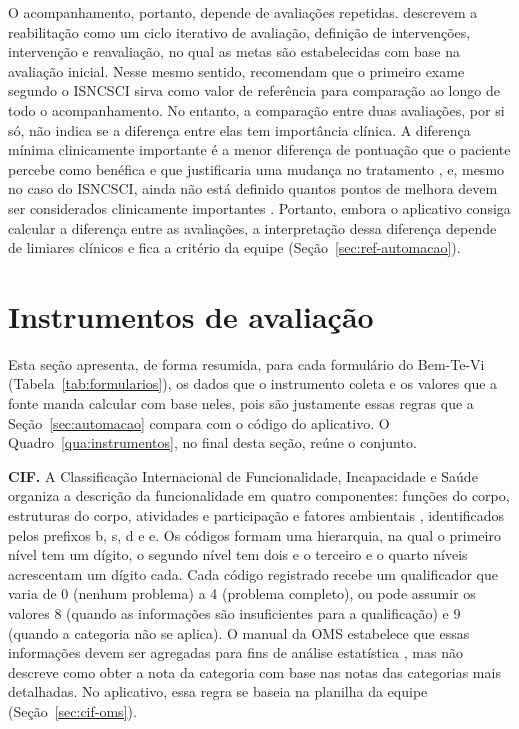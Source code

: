 O acompanhamento, portanto, depende de avaliações repetidas.  descrevem a
reabilitação como um ciclo iterativo de avaliação, definição de intervenções, intervenção e reavaliação, no qual as
metas são estabelecidas com base na avaliação inicial. Nesse mesmo sentido, 
recomendam que o primeiro exame segundo o ISNCSCI sirva como valor de referência para comparação ao longo de todo o
acompanhamento. No entanto, a comparação entre duas avaliações, por si só, não indica se a diferença entre elas tem
importância clínica. A diferença mínima clinicamente importante é a menor diferença de pontuação que o paciente
percebe como benéfica e que justificaria uma mudança no tratamento \cite[p.~408]{jaeschke1989mcid}, e, mesmo no
caso do ISNCSCI, ainda não está definido quantos pontos de melhora devem ser considerados clinicamente importantes
\cite[p.~9]{ahuja2017traumatic}. Portanto, embora o aplicativo consiga calcular a diferença entre as avaliações, a
interpretação dessa diferença depende de limiares clínicos e fica a critério da equipe (Seção~\ref{sec:ref-automacao}).

\section{Instrumentos de avaliação}
\label{sec:ref-instrumentos}

Esta seção apresenta, de forma resumida, para cada formulário do Bem-Te-Vi (Tabela~\ref{tab:formularios}), os dados
que o instrumento coleta e os valores que a fonte manda calcular com base neles, pois são justamente essas regras que
a Seção~\ref{sec:automacao} compara com o código do aplicativo. O Quadro~\ref{qua:instrumentos}, no final desta
seção, reúne o conjunto.

\textbf{CIF.} A Classificação Internacional de Funcionalidade, Incapacidade e Saúde organiza a descrição da
funcionalidade em quatro componentes: funções do corpo, estruturas do corpo, atividades e participação e fatores
ambientais \cite{who2001icf}, identificados pelos prefixos b, s, d e e. Os códigos formam uma hierarquia, na qual o
primeiro nível tem um dígito, o segundo nível tem dois e o terceiro e o quarto níveis acrescentam um dígito cada.
Cada código registrado recebe um qualificador que varia de 0 (nenhum problema) a 4 (problema completo), ou pode
assumir os valores 8 (quando as informações são insuficientes para a qualificação) e 9 (quando a categoria não se
aplica). O manual da OMS estabelece que essas informações devem ser agregadas para fins de análise estatística
\cite[p.~13,~26--28]{who2013howtouse}, mas não descreve como obter a nota da categoria com base nas notas das
categorias mais detalhadas. No aplicativo, essa regra se baseia na planilha da equipe (Seção~\ref{sec:cif-oms}).


